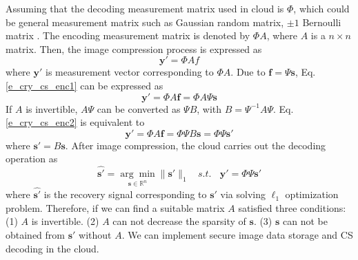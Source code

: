 \documentclass[conference]{IEEEtran}
\begin{document}
Assuming that the decoding measurement matrix used in cloud is $\Phi$, which could be general measurement matrix such as Gaussian random matrix, $\pm1$ Bernoulli matrix \cite{candes2006robust}. The encoding measurement matrix is denoted by $\Phi A$, where $A$ is a $n\times n$ matrix. Then, the image compression process is expressed as
\begin{equation}\label{e_cry_cs_enc1}
    \mathbf{y}'=\Phi A f
\end{equation}
where $\mathbf{y}'$ is measurement vector corresponding to $\Phi A$. Due to $\mathbf{f}=\Psi \mathbf{s}$, Eq. \ref{e_cry_cs_enc1} can be expressed as
\begin{equation}\label{e_cry_cs_enc2}
    \mathbf{y}'=\Phi A \mathbf{f}=\Phi A \Psi \mathbf{s}
\end{equation}
If $A$ is invertible, $A\Psi$ can be converted as $\Psi B$, with $B=\Psi^{-1}A\Psi$.  Eq. \ref{e_cry_cs_enc2} is equivalent to
\begin{equation}\label{e_cry_cs_enc3}
    \mathbf{y}'=\Phi A \mathbf{f}=\Phi\Psi B\mathbf{s}=\Phi\Psi \mathbf{s}'
\end{equation}
where  $\mathbf{s}'=B\mathbf{s}$. After image compression, the cloud carries out the decoding operation as
\begin{equation}\label{e_cry_cs_dec}
   \hat{\mathbf{s}'}=\underset{\mathbf{s}\in\mathbb{R}^n}{\arg\min}\|\mathbf{s}'\|_1 ~~~~s.t. ~~~~\mathbf{y}'=\Phi\Psi \mathbf{s}'
\end{equation}
where $\hat{\mathbf{s}'}$ is the recovery signal corresponding to $\mathbf{s}'$ via solving $\ell_1$ optimization problem.
Therefore, if we can find a suitable matrix $A$ satisfied three conditions: (1) $A$ is invertible. (2) $A$ can not decrease the sparsity of $\mathbf{s}$. (3) $\mathbf{s}$ can not be obtained from $\mathbf{s}'$ without $A$. We can implement secure image data storage and CS decoding in the cloud.
\end{document}
